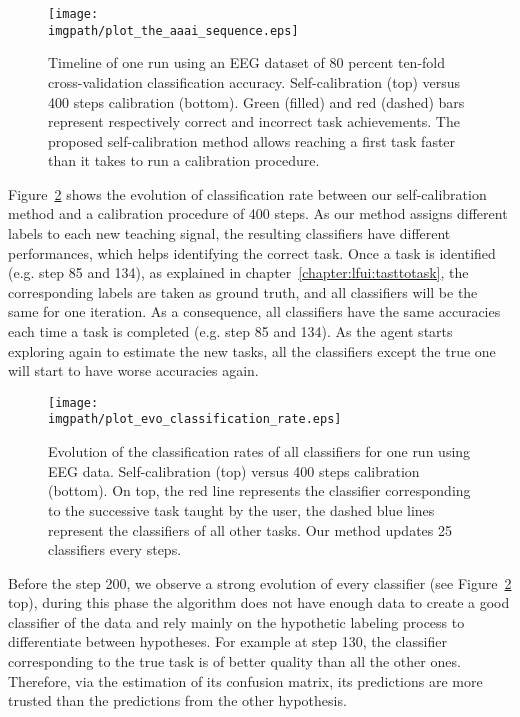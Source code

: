 
\begin{figure}[!htbp]
\centering
\texttt{[image: \\imgpath/plot\_the\_aaai\_sequence.eps]}
\caption{Timeline of one run using an EEG dataset of $80$ percent ten-fold cross-validation classification accuracy. Self-calibration (top) versus 400 steps calibration (bottom). Green (filled) and red (dashed) bars represent respectively correct and incorrect task achievements. The proposed self-calibration method allows reaching a first task faster than it takes to run a calibration procedure.}
\label{fig:sequence}
\end{figure} 

Figure~\ref{fig:sequence_evolution} shows the evolution of classification rate between our self-calibration method and a calibration procedure of 400 steps. As our method assigns different labels to each new teaching signal, the resulting classifiers have different performances, which helps identifying the correct task. Once a task is identified (e.g. step 85 and 134), as explained in chapter~\ref{chapter:lfui:tasttotask}, the corresponding labels are taken as ground truth, and all classifiers will be the same for one iteration. As a consequence, all classifiers have the same accuracies each time a task is completed (e.g. step 85 and 134). As the agent starts exploring again to estimate the new tasks, all the classifiers except the true one will start to have worse accuracies again.

\begin{figure}[!htbp]
\centering
\texttt{[image: \\imgpath/plot\_evo\_classification\_rate.eps]}
\caption{Evolution of the classification rates of all classifiers for one run using EEG data. Self-calibration (top) versus 400 steps calibration (bottom). On top, the red line represents the classifier corresponding to the successive task taught by the user, the dashed blue lines represent the classifiers of all other tasks. Our method updates 25 classifiers every steps.}
\label{fig:sequence_evolution}
\end{figure}

Before the step 200, we observe a strong evolution of every classifier (see Figure~\ref{fig:sequence_evolution} top), during this phase the algorithm does not have enough data to create a good classifier of the data and rely mainly on the hypothetic labeling process to differentiate between hypotheses. For example at step 130, the classifier corresponding to the true task is of better quality than all the other ones. Therefore, via the estimation of its confusion matrix, its predictions are more trusted than the predictions from the other hypothesis.


